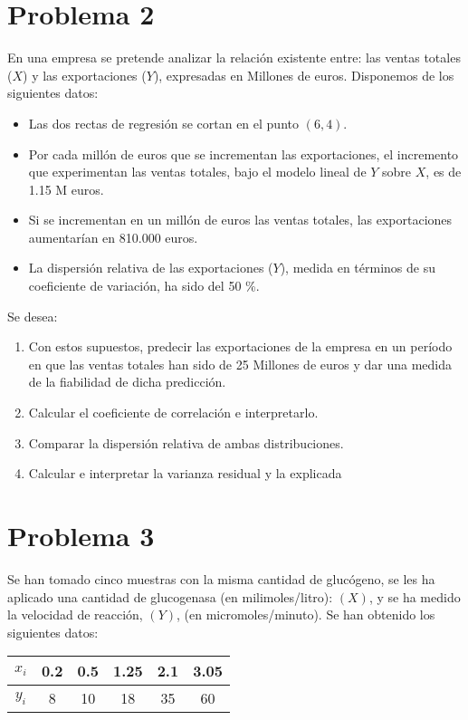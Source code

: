 \documentclass[fleqn]{article}
\begin{document}
	\section{Problema 2}
	En una empresa se pretende analizar la relación existente entre: las ventas totales ($X$) y las exportaciones ($Y$), expresadas en Millones de euros. 
	Disponemos de los siguientes datos:
	\begin{itemize}
		\item Las dos rectas de regresión se cortan en el punto $(6,4)$.
		\item Por cada millón de euros que se incrementan las exportaciones, el incremento que experimentan las ventas totales, bajo el modelo lineal de $Y$ sobre $X$, es de 1.15 M euros.  
		\item Si se incrementan en un millón de euros las ventas totales, las exportaciones aumentarían en 810.000 euros. 
		\item La dispersión relativa de las exportaciones ($Y$), medida en términos de su coeficiente de variación, ha sido del 50 \%.
	\end{itemize}
	Se desea:
	\begin{enumerate}
		\item Con estos supuestos, predecir las exportaciones de la empresa en un período en que las ventas totales han sido de 25 Millones de euros y dar una medida de la fiabilidad de dicha predicción.
		\item Calcular el coeficiente de correlación e interpretarlo.
		\item Comparar la dispersión relativa de ambas distribuciones.
		\item Calcular e interpretar la varianza residual y la explicada
	\end{enumerate}
	\section{Problema 3}
	Se han tomado cinco muestras con la misma cantidad de glucógeno, se les ha aplicado una cantidad de glucogenasa (en milimoles/litro): $( X )$, y se ha medido la velocidad de reacción, $( Y )$, (en micromoles/minuto). Se han obtenido los siguientes datos: \\
	\begin{table}[h!]
		\centering
		\begin{tabular}{|c|c|c|c|c|c|}
			\hline
			\( x_i \) & 0.2 & 0.5 & 1.25 & 2.1 & 3.05 \\ \hline
			\( y_i \) & 8 & 10 & 18 & 35 & 60 \\ \hline
		\end{tabular}
	\end{table}
	
\end{document}
